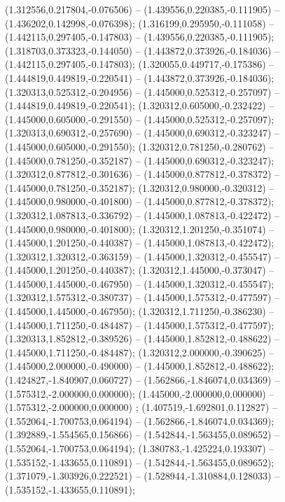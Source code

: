  (1.312556,0.217804,-0.076506) -- (1.439556,0.220385,-0.111905) -- (1.436202,0.142998,-0.076398);
 (1.316199,0.295950,-0.111058) -- (1.442115,0.297405,-0.147803) -- (1.439556,0.220385,-0.111905);
 (1.318703,0.373323,-0.144050) -- (1.443872,0.373926,-0.184036) -- (1.442115,0.297405,-0.147803);
 (1.320055,0.449717,-0.175386) -- (1.444819,0.449819,-0.220541) -- (1.443872,0.373926,-0.184036);
 (1.320313,0.525312,-0.204956) -- (1.445000,0.525312,-0.257097) -- (1.444819,0.449819,-0.220541);
 (1.320312,0.605000,-0.232422) -- (1.445000,0.605000,-0.291550) -- (1.445000,0.525312,-0.257097);
 (1.320313,0.690312,-0.257690) -- (1.445000,0.690312,-0.323247) -- (1.445000,0.605000,-0.291550);
 (1.320312,0.781250,-0.280762) -- (1.445000,0.781250,-0.352187) -- (1.445000,0.690312,-0.323247);
 (1.320312,0.877812,-0.301636) -- (1.445000,0.877812,-0.378372) -- (1.445000,0.781250,-0.352187);
 (1.320312,0.980000,-0.320312) -- (1.445000,0.980000,-0.401800) -- (1.445000,0.877812,-0.378372);
 (1.320312,1.087813,-0.336792) -- (1.445000,1.087813,-0.422472) -- (1.445000,0.980000,-0.401800);
 (1.320312,1.201250,-0.351074) -- (1.445000,1.201250,-0.440387) -- (1.445000,1.087813,-0.422472);
 (1.320312,1.320312,-0.363159) -- (1.445000,1.320312,-0.455547) -- (1.445000,1.201250,-0.440387);
 (1.320312,1.445000,-0.373047) -- (1.445000,1.445000,-0.467950) -- (1.445000,1.320312,-0.455547);
 (1.320312,1.575312,-0.380737) -- (1.445000,1.575312,-0.477597) -- (1.445000,1.445000,-0.467950);
 (1.320312,1.711250,-0.386230) -- (1.445000,1.711250,-0.484487) -- (1.445000,1.575312,-0.477597);
 (1.320313,1.852812,-0.389526) -- (1.445000,1.852812,-0.488622) -- (1.445000,1.711250,-0.484487);
 (1.320312,2.000000,-0.390625) -- (1.445000,2.000000,-0.490000) -- (1.445000,1.852812,-0.488622);
 (1.424827,-1.840907,0.060727) -- (1.562866,-1.846074,0.034369) -- (1.575312,-2.000000,0.000000);
 (1.445000,-2.000000,0.000000) -- (1.575312,-2.000000,0.000000) ;
 (1.407519,-1.692801,0.112827) -- (1.552064,-1.700753,0.064194) -- (1.562866,-1.846074,0.034369);
 (1.392889,-1.554565,0.156866) -- (1.542844,-1.563455,0.089652) -- (1.552064,-1.700753,0.064194);
 (1.380783,-1.425224,0.193307) -- (1.535152,-1.433655,0.110891) -- (1.542844,-1.563455,0.089652);
 (1.371079,-1.303926,0.222521) -- (1.528944,-1.310884,0.128033) -- (1.535152,-1.433655,0.110891);
